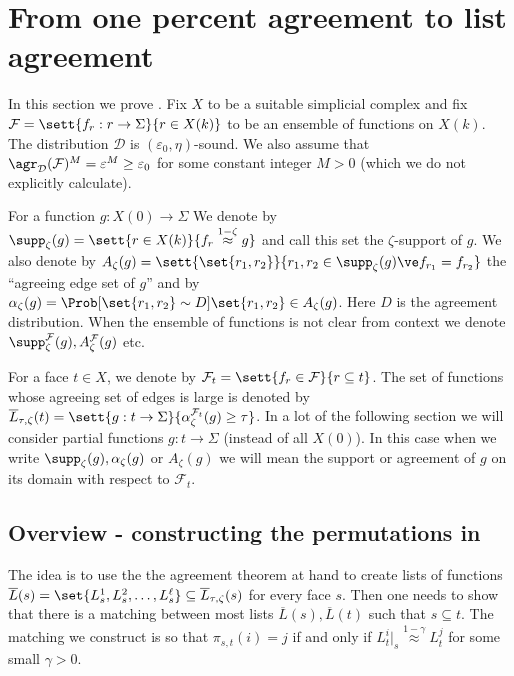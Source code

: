 \section{From one percent agreement to list agreement} \label{sec:proof-of-lem-from-1-percent}
In this section we prove . 
Fix \(X\) to be a suitable simplicial complex and fix \(\mathcal{F} = \sett{f_r:r\to \Sigma}{r \in X(k)}\) to be an ensemble of functions on \(X(k)\). The distribution \(\mathcal{D}\) is \((\varepsilon_0,\eta)\)-sound. We also assume that \(\agr_{\mathcal{D}}(\mathcal{F})^{M}=\varepsilon^{M} \geq \varepsilon_0\) for some constant integer \(M > 0\) (which we do not explicitly calculate).

For a function \(g:X(0) \to \Sigma\) We denote by \(\supp_{\zeta}(g) = \sett{r \in X(k)}{f_r \overset{1-\zeta}{\approx} g}\) and call this set the \(\zeta\)-support of \(g\). We also denote by \(A_\zeta(g) = \sett{\set{r_1,r_2}}{r_1,r_2 \in \supp_\zeta (g) \ve f_{r_1}=f_{r_2}}\) the ``agreeing edge set of \(g\)'' and by \(\alpha_{\zeta}(g) = \Prob[\set{r_1,r_2} \sim D]{\set{r_1,r_2} \in A_{\zeta}(g)}\). Here \(D\) is the agreement distribution. When the ensemble of functions is not clear from context we denote \(\supp_{\zeta}^{\mathcal{F}}(g), A_{\zeta}^{\mathcal{F}}(g)\) etc.

For a face \(t \in X\), we denote by \(\mathcal{F}_t = \sett{f_r \in \mathcal{F}}{r \subseteq t}\). The set of functions whose agreeing set of edges is large is denoted by \(\overline{L}_{\tau,\zeta}(t) = \sett{g:t \to \Sigma}{\alpha_{\zeta}^{\mathcal{F}_t} (g) \geq \tau}\). In a lot of the following section we will consider partial functions \(g:t \to \Sigma\) (instead of all \(X(0)\)). In this case when we write \(\supp_\zeta(g), \alpha_\zeta(g)\) or \(A_\zeta (g)\) we will mean the support or agreement of \(g\) on its domain with respect to \(\mathcal{F}_t\).

\subsection{Overview - constructing the permutations in }
The idea is to use the the agreement theorem at hand to create lists of functions \(\overline{L}(s)=\set{L_s^1,L_s^2,\dots,L_s^\ell} \subseteq \overline{L}_{\tau,\zeta}(s)\) for every face \(s\). 
Then one needs to show that there is a matching between most lists \(\overline{L}(s), \overline{L}(t)\) such that \(s \subseteq t\). The matching we construct is so that \(\pi_{s,t}(i)=j\) if and only if \(L_t^i|_s \overset{1-\gamma}{\approx} L_t^j\) for some small \(\gamma>0\).

